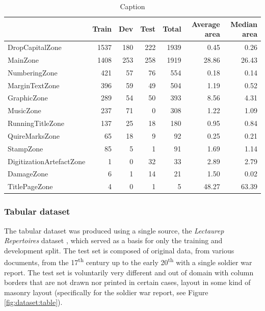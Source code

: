 \documentclass{jdmdh}
\begin{document}
\begin{table}[ht]
    \centering
    \begin{tabular}{l|rrr|r|rr}
    \hline
                              &   Train &   Dev &   Test &   Total &   Average area &   Median area \\
    \hline
     DropCapitalZone          &    1537 &   180 &    222 &    1939 &           0.45 &          0.26 \\
     MainZone                 &    1408 &   253 &    258 &    1919 &          28.86 &         26.43 \\
     NumberingZone            &     421 &    57 &     76 &     554 &           0.18 &          0.14 \\
     MarginTextZone           &     396 &    59 &     49 &     504 &           1.19 &          0.52 \\
     GraphicZone              &     289 &    54 &     50 &     393 &           8.56 &          4.31 \\
     MusicZone                &     237 &    71 &      0 &     308 &           1.22 &          1.09 \\
     RunningTitleZone         &     137 &    25 &     18 &     180 &           0.95 &          0.84 \\
     QuireMarksZone           &      65 &    18 &      9 &      92 &           0.25 &          0.21 \\
     StampZone                &      85 &     5 &      1 &      91 &           1.69 &          1.14 \\
     DigitizationArtefactZone &       1 &     0 &     32 &      33 &           2.89 &          2.79 \\
     DamageZone               &       6 &     1 &     14 &      21 &           1.50 &          0.02 \\
     TitlePageZone            &       4 &     0 &      1 &       5 &          48.27 &         63.39 \\
    \hline
    \end{tabular}
    \caption{Caption}
    \label{tab:comp:segmonto}
\end{table}

\subsubsection{Tabular dataset}
\label{subsubsection:tabulardataset}

The tabular dataset was produced using a single source, the \textit{Lectaurep Repertoires} dataset \citep{p2021notaires}, which served as a basis for only the training and development split. The test set is composed of original data, from various documents, from the 17\textsuperscript{th} century up to the early 20\textsuperscript{th} with a single soldier war report. The test set is voluntarily very different and out of domain with column borders that are not drawn nor printed in certain cases, layout in some kind of masonry layout (specifically for the soldier war report, see Figure \ref{fig:dataset:table}).
\end{document}

